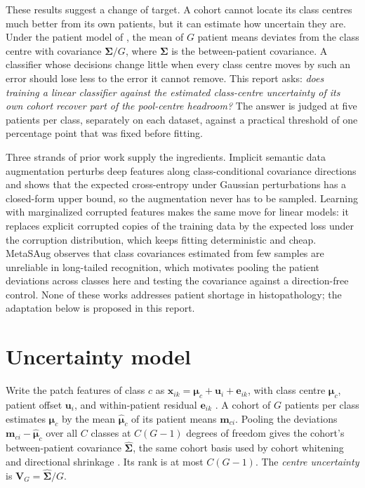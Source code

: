 \documentclass[11pt]{article}
\begin{document}
These results suggest a change of target. A cohort cannot locate its class centres much better from its own patients, but it can estimate how uncertain they are. Under the patient model of \citet{queisler2026centreError}, the mean of $G$ patient means deviates from the class centre with covariance $\boldsymbol\Sigma/G$, where $\boldsymbol\Sigma$ is the between-patient covariance. A classifier whose decisions change little when every class centre moves by such an error should lose less to the error it cannot remove. This report asks: \emph{does training a linear classifier against the estimated class-centre uncertainty of its own cohort recover part of the pool-centre headroom?} The answer is judged at five patients per class, separately on each dataset, against a practical threshold of one percentage point that was fixed before fitting.

Three strands of prior work supply the ingredients. Implicit semantic data augmentation \citep{wang2019isda} perturbs deep features along class-conditional covariance directions and shows that the expected cross-entropy under Gaussian perturbations has a closed-form upper bound, so the augmentation never has to be sampled. Learning with marginalized corrupted features \citep{vandermaaten2013mcf} makes the same move for linear models: it replaces explicit corrupted copies of the training data by the expected loss under the corruption distribution, which keeps fitting deterministic and cheap. MetaSAug \citep{li2021metasaug} observes that class covariances estimated from few samples are unreliable in long-tailed recognition, which motivates pooling the patient deviations across classes here and testing the covariance against a direction-free control. None of these works addresses patient shortage in histopathology; the adaptation below is proposed in this report.

\section{Uncertainty model}
\label{sec:model}
Write the patch features of class $c$ as $\mathbf x_{ik}=\boldsymbol\mu_c+\mathbf u_i+\mathbf e_{ik}$, with class centre $\boldsymbol\mu_c$, patient offset $\mathbf u_i$, and within-patient residual $\mathbf e_{ik}$ \citep{queisler2026centreError}. A cohort of $G$ patients per class estimates $\boldsymbol\mu_c$ by the mean $\hat{\boldsymbol\mu}_c$ of its patient means $\mathbf m_{ci}$. Pooling the deviations $\mathbf m_{ci}-\hat{\boldsymbol\mu}_c$ over all $C$ classes at $C(G-1)$ degrees of freedom gives the cohort's between-patient covariance $\hat{\boldsymbol\Sigma}$, the same cohort basis used by cohort whitening \citep{queisler2026patientDirections} and directional shrinkage \citep{queisler2026directionalShrinkage}. Its rank is at most $C(G-1)$. The \emph{centre uncertainty} is $\mathbf V_G=\hat{\boldsymbol\Sigma}/G$.
\end{document}

